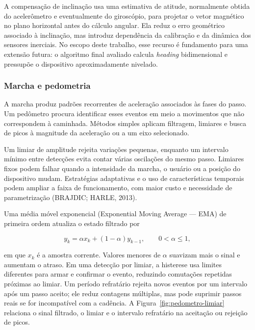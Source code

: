 \documentclass{article}
\begin{document}
A compensa\c{c}\~ao de inclina\c{c}\~ao usa uma estimativa de atitude, normalmente obtida do aceler\^ometro e eventualmente do girosc\'opio, para projetar o vetor magn\'etico no plano horizontal antes do c\'alculo angular. Ela reduz o erro geom\'etrico associado \`a inclina\c{c}\~ao, mas introduz depend\^encia da calibra\c{c}\~ao e da din\^amica dos sensores inerciais. No escopo deste trabalho, esse recurso \'e fundamento para uma extens\~ao futura: o algoritmo final avaliado calcula \emph{heading} bidimensional e pressup\~oe o dispositivo aproximadamente nivelado.


\subsubsection{Marcha e pedometria}


A marcha produz padr\~oes recorrentes de acelera\c{c}\~ao associados \`as fases do passo. Um ped\^ometro procura identificar esses eventos em meio a movimentos que n\~ao correspondem \`a caminhada. M\'etodos simples aplicam filtragem, limiares e busca de picos \`a magnitude da acelera\c{c}\~ao ou a um eixo selecionado.


Um limiar de amplitude rejeita varia\c{c}\~oes pequenas, enquanto um intervalo m\'inimo entre detec\c{c}\~oes evita contar v\'arias oscila\c{c}\~oes do mesmo passo. Limiares fixos podem falhar quando a intensidade da marcha, o usu\'ario ou a posi\c{c}\~ao do dispositivo mudam. Estrat\'egias adaptativas e o uso de caracter\'isticas temporais podem ampliar a faixa de funcionamento, com maior custo e necessidade de parametriza\c{c}\~ao (BRAJDIC; HARLE, 2013).


Uma m\'edia m\'ovel exponencial (Exponential Moving Average --- EMA) de primeira ordem atualiza o estado filtrado por


\[
y_k=\alpha x_k+(1-\alpha)y_{k-1}, \qquad 0<\alpha\leq 1,
\]


em que \(x_k\) \'e a amostra corrente. Valores menores de \(\alpha\) suavizam mais o sinal e aumentam o atraso. Em uma detec\c{c}\~ao por limiar, a histerese usa limites diferentes para armar e confirmar o evento, reduzindo comuta\c{c}\~oes repetidas pr\'oximas ao limiar. Um per\'iodo refrat\'ario rejeita novos eventos por um intervalo ap\'os um passo aceito; ele reduz contagens m\'ultiplas, mas pode suprimir passos reais se for incompat\'ivel com a cad\^encia. A Figura~\ref{fig:pedometro-limiar} relaciona o sinal filtrado, o limiar e o intervalo refrat\'ario na aceita\c{c}\~ao ou rejei\c{c}\~ao de picos.
\end{document}
